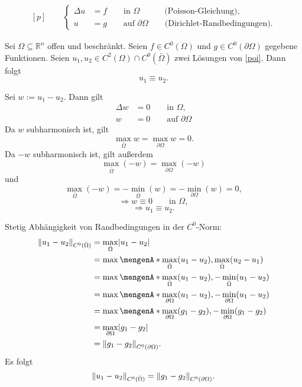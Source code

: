 \begin{align}\label{poi}\tag{p}
	[p] \qquad \begin{cases}
		\Delta u &= f \qquad \text{in }\Omega \qquad \quad \text{(Poisson-Gleichung),}\\
		u&=g \qquad \text{auf }\partial \Omega \qquad \text{(Dirichlet-Randbedingungen).}
	\end{cases}
 \end{align}

\begin{korollar}
	Sei $\Omega \subseteq \mathbb{R}^n$ offen und beschränkt. Seien $f \in C^0(\Omega)$ und $g \in C^0(\partial \Omega)$ gegebene Funktionen. Seien $u_1,u_2 \in C^2(\Omega)\cap C^0(\bar{\Omega})$ zwei Lösungen von \eqref{poi}. Dann folgt
	\begin{equation}
		u_1 \equiv u_2.
	\end{equation}
\end{korollar}
\begin{beweis}
	Sei $w := u_1 - u_2$. Dann gilt
	\begin{align}
		\Delta w &= 0 \qquad \text{in }\Omega, \\
		w &= 0 \qquad \text{auf }\partial \Omega
	\end{align}
	Da $w$ subharmonisch ist, gilt
	\begin{equation}
		\max_{\bar{\Omega}} w = \max_{\partial \Omega} w = 0.
	\end{equation}
	Da $-w$ subharmonisch ist, gilt außerdem
	\begin{equation} 
		\max_{\bar{\Omega}}(-w) = \max_{\partial \Omega}(-w)
	\end{equation}
	und \begin{equation}
		\max_{\bar{\Omega}}(-w) = - \min_{\bar{\Omega}}(w) = - \min_{\partial \Omega}(w) = 0,
	\end{equation}
	\begin{equation}
		\Rightarrow w \equiv 0 \qquad \text{in }\Omega,
	\end{equation}
	\[
		\Rightarrow u_1 \equiv u_2.
	\]
	\end{beweis}
Stetig Abhängigkeit von Randbedingungen in der $C^0$-Norm:
\begin{align*}
	\norm{u_1-u_2}_{C^0(\bar{\Omega})} &= \max_{\bar{\Omega}} \abs{u_1-u_2} \\
	&= \max \set{ \max_{\bar{\Omega}} (u_1-u_2), \max_{\bar{\Omega}}(u_2-u_1) } \\
	&= \max \set{ \max_{\bar{\Omega}} (u_1-u_2), -\min_{\bar{\Omega}}(u_1-u_2) } \\
	&= \max \set{ \max_{\partial \Omega} (u_1-u_2), -\min_{\partial \Omega}(u_1-u_2) } \\
	&= \max \set{ \max_{\partial \Omega} (g_1-g_2), -\min_{\partial \Omega}(g_1-g_2) } \\
	&= \max_{\partial \Omega} \abs{g_1-g_2} \\
	&= \norm{g_1-g_2}_{C^0(\partial \Omega)}.
\end{align*}
Es folgt
\[
	\norm{u_1-u_2}_{C^0(\bar{\Omega})} = \norm{g_1-g_2}_{C^0(\partial \Omega)}.
\]


